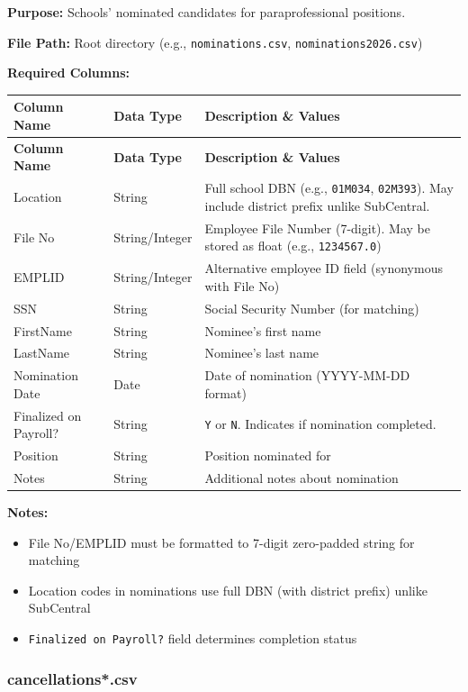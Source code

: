 \documentclass[12pt,letterpaper]{article}
\begin{document}
\textbf{Purpose:} Schools' nominated candidates for paraprofessional positions.

\textbf{File Path:} Root directory (e.g., \texttt{nominations.csv}, \texttt{nominations2026.csv})

\textbf{Required Columns:}

\begin{longtable}{p{3.5cm}p{2.5cm}p{7cm}}
\toprule
\textbf{Column Name} & \textbf{Data Type} & \textbf{Description \& Values} \\
\midrule
\endfirsthead
\toprule
\textbf{Column Name} & \textbf{Data Type} & \textbf{Description \& Values} \\
\midrule
\endhead
Location & String & Full school DBN (e.g., \texttt{01M034}, \texttt{02M393}). May include district prefix unlike SubCentral. \\
\midrule
File No & String/Integer & Employee File Number (7-digit). May be stored as float (e.g., \texttt{1234567.0}) \\
\midrule
EMPLID & String/Integer & Alternative employee ID field (synonymous with File No) \\
\midrule
SSN & String & Social Security Number (for matching) \\
\midrule
FirstName & String & Nominee's first name \\
\midrule
LastName & String & Nominee's last name \\
\midrule
Nomination Date & Date & Date of nomination (YYYY-MM-DD format) \\
\midrule
Finalized on Payroll? & String & \texttt{Y} or \texttt{N}. Indicates if nomination completed. \\
\midrule
Position & String & Position nominated for \\
\midrule
Notes & String & Additional notes about nomination \\
\bottomrule
\end{longtable}

\textbf{Notes:}
\begin{itemize}[leftmargin=*]
    \item File No/EMPLID must be formatted to 7-digit zero-padded string for matching
    \item Location codes in nominations use full DBN (with district prefix) unlike SubCentral
    \item \texttt{Finalized on Payroll?} field determines completion status
\end{itemize}

\subsubsection{cancellations*.csv}
\end{document}
